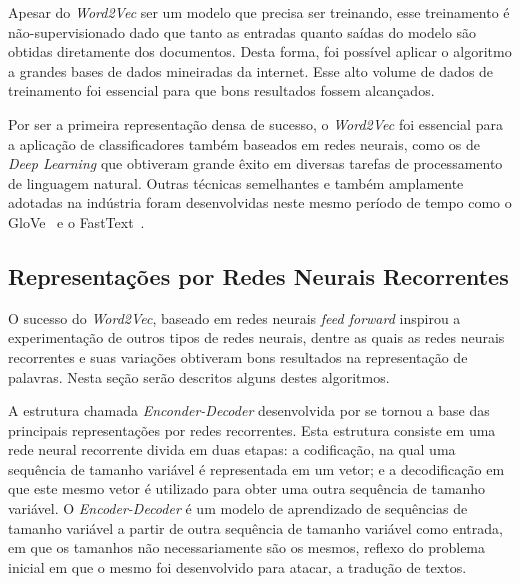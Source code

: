Apesar do \textit{Word2Vec} ser um modelo que precisa ser treinando, esse
treinamento é não-supervisionado dado que tanto as entradas quanto saídas do
modelo são obtidas diretamente dos documentos.
Desta forma, foi possível aplicar o algoritmo a grandes bases de dados
mineiradas da internet.
Esse alto volume de dados de treinamento foi essencial para que bons resultados
fossem alcançados.

Por ser a primeira representação densa de sucesso, o \textit{Word2Vec} foi
essencial para a aplicação de classificadores também baseados em redes neurais,
como os de \textit{Deep Learning} que obtiveram grande êxito em diversas
tarefas de processamento de linguagem natural.
Outras técnicas semelhantes e também amplamente adotadas na indústria foram
desenvolvidas neste mesmo período de tempo como o GloVe~\cite{pennington14} e
o FastText~\cite{bojanowski17}.


\subsection{Representações por Redes Neurais Recorrentes}
\label{representation:rnn}

O sucesso do \textit{Word2Vec}, baseado em redes neurais \textit{feed forward}
inspirou a experimentação de outros tipos de redes neurais, dentre as quais as
redes neurais recorrentes e suas variações obtiveram bons resultados na
representação de palavras.
Nesta seção serão descritos alguns destes algoritmos.

A estrutura chamada \textit{Enconder-Decoder} desenvolvida por \citet{cho14} se
tornou a base das principais representações por redes recorrentes.
Esta estrutura consiste em uma rede neural recorrente divida em duas etapas: a
codificação, na qual uma sequência de tamanho variável é representada em um
vetor; e a decodificação em que este mesmo vetor é utilizado para obter uma
outra sequência de tamanho variável.
O \textit{Encoder-Decoder} é um modelo de aprendizado de sequências de tamanho
variável a partir de outra sequência de tamanho variável como entrada, em que
os tamanhos não necessariamente são os mesmos, reflexo do problema inicial em
que o mesmo foi desenvolvido para atacar, a tradução de textos.

